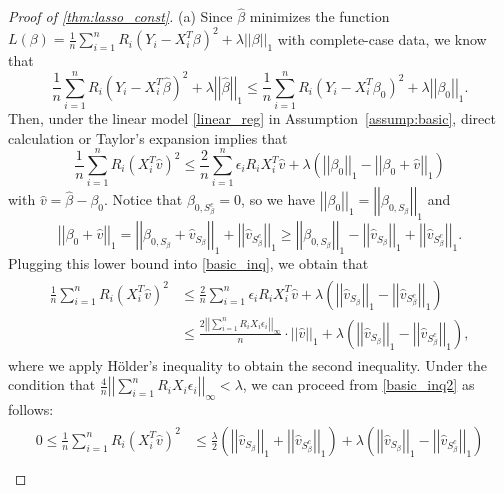 \documentclass[ejsv2,noshowframe]{imsart}
\theoremstyle{plain}
\theoremstyle{definition}
\theoremstyle{remark}
\newcommand{\norm}[1]{\left|\left| #1 \right|\right|}
\renewcommand{\hat}{\widehat}
\begin{document}
\begin{proof}[Proof of \autoref{thm:lasso_const}]
	(a) Since $\hat{\beta}$ minimizes the function $L(\beta) = \frac{1}{n}\sum_{i=1}^n R_i\left(Y_i -X_i^T\beta\right)^2 + \lambda\norm{\beta}_1$ with complete-case data, we know that 
	$$\frac{1}{n}\sum_{i=1}^n R_i\left(Y_i -X_i^T\hat{\beta}\right)^2 + \lambda\norm{\hat{\beta}}_1 \leq \frac{1}{n}\sum_{i=1}^n R_i\left(Y_i -X_i^T\beta_0\right)^2 + \lambda\norm{\beta_0}_1.$$
	Then, under the linear model \eqref{linear_reg} in Assumption~\ref{assump:basic}, direct calculation or Taylor's expansion implies that
	\begin{equation}
		\label{basic_inq}
		\frac{1}{n}\sum_{i=1}^n R_i\left(X_i^T\hat{v}\right)^2 \leq \frac{2}{n}\sum_{i=1}^n \epsilon_i R_i X_i^T \hat{v} + \lambda\left(\norm{\beta_0}_1 - \norm{\beta_0 + \hat{v}}_1 \right)
	\end{equation}
	with $\hat{v} = \hat{\beta}-\beta_0$. Notice that $\beta_{0,S_{\beta}^c} =0$, so we have $\norm{\beta_0}_1 = \norm{\beta_{0,S_{\beta}}}_1$ and 
	$$\norm{\beta_0 + \hat{v}}_1 = \norm{\beta_{0,S_{\beta}} + \hat{v}_{S_{\beta}}}_1 + \norm{\hat{v}_{S_{\beta}^c}}_1 \geq \norm{\beta_{0,S_{\beta}}}_1 - \norm{\hat{v}_{S_{\beta}}}_1 + \norm{\hat{v}_{S_{\beta}^c}}_1.$$
	Plugging this lower bound into \eqref{basic_inq}, we obtain that
	\begin{align}
		\label{basic_inq2}
		\begin{split}
			\frac{1}{n}\sum_{i=1}^n R_i\left(X_i^T\hat{v}\right)^2 &\leq \frac{2}{n}\sum_{i=1}^n \epsilon_i R_i X_i^T \hat{v} + \lambda \left(\norm{\hat{v}_{S_{\beta}}}_1 -\norm{\hat{v}_{S_{\beta}^c}}_1 \right)\\
			&\leq \frac{2\norm{\sum_{i=1}^n R_iX_i\epsilon_i}_{\infty}}{n} \cdot \norm{\hat{v}}_1 + \lambda \left(\norm{\hat{v}_{S_{\beta}}}_1 -\norm{\hat{v}_{S_{\beta}^c}}_1 \right),
		\end{split}
	\end{align}
	where we apply H{\"o}lder's inequality to obtain the second inequality. Under the condition that $\frac{4}{n} \norm{\sum_{i=1}^n R_iX_i\epsilon_i}_{\infty} < \lambda$, we can proceed from \eqref{basic_inq2} as follows:
	\begin{align}
		\label{basic_inq3}
		\begin{split}
			0\leq \frac{1}{n}\sum_{i=1}^n R_i\left(X_i^T\hat{v}\right)^2 &\leq \frac{\lambda}{2} \left(\norm{\hat{v}_{S_{\beta}}}_1 + \norm{\hat{v}_{S_{\beta}^c}}_1 \right) + \lambda \left(\norm{\hat{v}_{S_{\beta}}}_1 -\norm{\hat{v}_{S_{\beta}^c}}_1 \right)\\

\end{split}
\end{align}
\end{proof}
\end{document}
